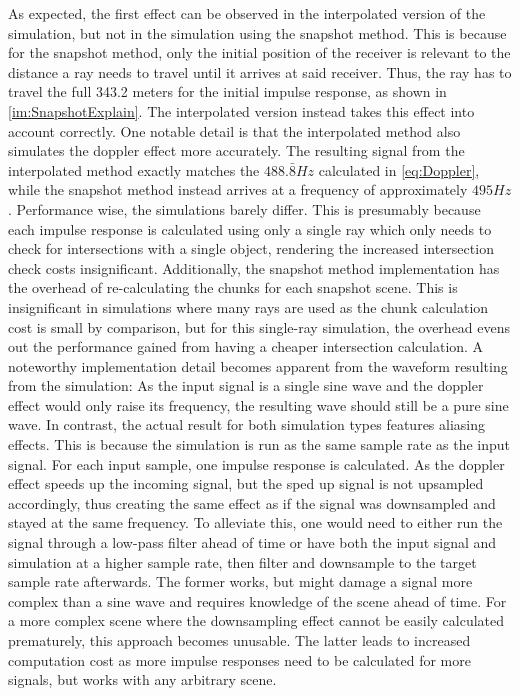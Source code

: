 As expected, the first effect can be observed in the interpolated version of the simulation,
but not in the simulation using the snapshot method.
\newline
This is because for the snapshot method,
only the initial position of the receiver is relevant to the distance a ray needs to travel until it arrives at said receiver.
Thus, the ray has to travel the full 343.2 meters for the initial impulse response, as shown in \ref{im:SnapshotExplain}.
\newline
The interpolated version instead takes this effect into account correctly.
\newline
One notable detail is that the interpolated method also simulates the doppler effect more accurately.
The resulting signal from the interpolated method exactly matches the \(488.\bar{8} Hz\) calculated in \eqref{eq:Doppler},
while the snapshot method instead arrives at a frequency of approximately \(495 Hz\).
\newline
Performance wise, the simulations barely differ.
This is presumably because each impulse response is calculated using only a single ray
which only needs to check for intersections with a single object,
rendering the increased intersection check costs insignificant.
\newline
Additionally, the snapshot method implementation has the overhead of re-calculating
the chunks for each snapshot scene.
This is insignificant in simulations where many rays are used
as the chunk calculation cost is small by comparison,
but for this single-ray simulation, the overhead evens out the performance gained from having a cheaper intersection calculation.
\newline
A noteworthy implementation detail becomes apparent from the waveform resulting from the simulation:
As the input signal is a single sine wave and the doppler effect would only raise its frequency,
the resulting wave should still be a pure sine wave.
In contrast, the actual result for both simulation types features aliasing effects.
\newline
This is because the simulation is run as the same sample rate as the input signal.
For each input sample, one impulse response is calculated.
As the doppler effect speeds up the incoming signal,
but the sped up signal is not upsampled accordingly,
thus creating the same effect as if the signal was downsampled and stayed at the same frequency.
\newline
To alleviate this, one would need to either run the signal through a low-pass filter ahead of time
or have both the input signal and simulation at a higher sample rate,
then filter and downsample to the target sample rate afterwards.
\newline
The former works, but might damage a signal more complex than a sine wave
and requires knowledge of the scene ahead of time.
For a more complex scene where the downsampling effect cannot be easily calculated prematurely,
this approach becomes unusable.
\newline
The latter leads to increased computation cost as more impulse responses need to be calculated for more signals,
but works with any arbitrary scene.
